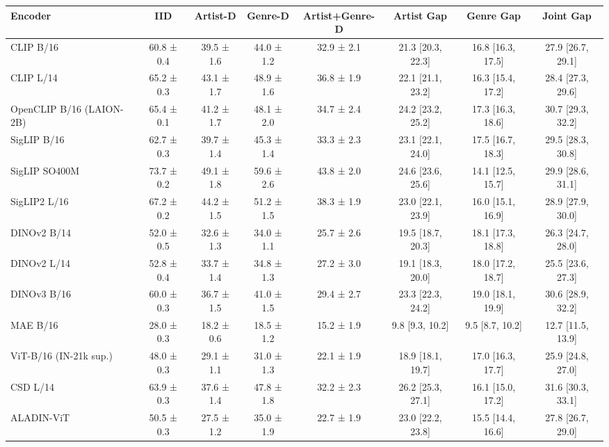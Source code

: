 \begin{tabular}{lccccccc}
\toprule
Encoder & IID & Artist-D & Genre-D & Artist+Genre-D & Artist Gap & Genre Gap & Joint Gap \\
\midrule
CLIP B/16 & 60.8 ± 0.4 & 39.5 ± 1.6 & 44.0 ± 1.2 & 32.9 ± 2.1 & 21.3 [20.3, 22.3] & 16.8 [16.3, 17.5] & 27.9 [26.7, 29.1] \\
CLIP L/14 & 65.2 ± 0.3 & 43.1 ± 1.7 & 48.9 ± 1.6 & 36.8 ± 1.9 & 22.1 [21.1, 23.2] & 16.3 [15.4, 17.2] & 28.4 [27.3, 29.6] \\
OpenCLIP B/16 (LAION-2B) & 65.4 ± 0.1 & 41.2 ± 1.7 & 48.1 ± 2.0 & 34.7 ± 2.4 & 24.2 [23.2, 25.2] & 17.3 [16.3, 18.6] & 30.7 [29.3, 32.2] \\
SigLIP B/16 & 62.7 ± 0.3 & 39.7 ± 1.4 & 45.3 ± 1.4 & 33.3 ± 2.3 & 23.1 [22.1, 24.0] & 17.5 [16.7, 18.3] & 29.5 [28.3, 30.8] \\
SigLIP SO400M & 73.7 ± 0.2 & 49.1 ± 1.8 & 59.6 ± 2.6 & 43.8 ± 2.0 & 24.6 [23.6, 25.6] & 14.1 [12.5, 15.7] & 29.9 [28.6, 31.1] \\
SigLIP2 L/16 & 67.2 ± 0.2 & 44.2 ± 1.5 & 51.2 ± 1.5 & 38.3 ± 1.9 & 23.0 [22.1, 23.9] & 16.0 [15.1, 16.9] & 28.9 [27.9, 30.0] \\
DINOv2 B/14 & 52.0 ± 0.5 & 32.6 ± 1.3 & 34.0 ± 1.1 & 25.7 ± 2.6 & 19.5 [18.7, 20.3] & 18.1 [17.3, 18.8] & 26.3 [24.7, 28.0] \\
DINOv2 L/14 & 52.8 ± 0.4 & 33.7 ± 1.4 & 34.8 ± 1.3 & 27.2 ± 3.0 & 19.1 [18.3, 20.0] & 18.0 [17.2, 18.7] & 25.5 [23.6, 27.3] \\
DINOv3 B/16 & 60.0 ± 0.3 & 36.7 ± 1.5 & 41.0 ± 1.5 & 29.4 ± 2.7 & 23.3 [22.3, 24.2] & 19.0 [18.1, 19.9] & 30.6 [28.9, 32.2] \\
MAE B/16 & 28.0 ± 0.3 & 18.2 ± 0.6 & 18.5 ± 1.2 & 15.2 ± 1.9 & 9.8 [9.3, 10.2] & 9.5 [8.7, 10.2] & 12.7 [11.5, 13.9] \\
ViT-B/16 (IN-21k sup.) & 48.0 ± 0.3 & 29.1 ± 1.1 & 31.0 ± 1.3 & 22.1 ± 1.9 & 18.9 [18.1, 19.7] & 17.0 [16.3, 17.7] & 25.9 [24.8, 27.0] \\
CSD L/14 & 63.9 ± 0.3 & 37.6 ± 1.4 & 47.8 ± 1.8 & 32.2 ± 2.3 & 26.2 [25.3, 27.1] & 16.1 [15.0, 17.2] & 31.6 [30.3, 33.1] \\
ALADIN-ViT & 50.5 ± 0.3 & 27.5 ± 1.2 & 35.0 ± 1.9 & 22.7 ± 1.9 & 23.0 [22.2, 23.8] & 15.5 [14.4, 16.6] & 27.8 [26.7, 29.0] \\
\bottomrule
\end{tabular}
